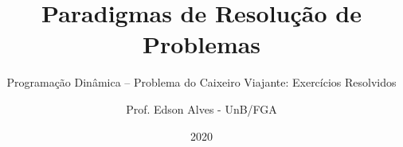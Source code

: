 \title{Paradigmas de Resolução de Problemas}
\subtitle{Programação Dinâmica -- Problema do Caixeiro Viajante: Exercícios Resolvidos}
\author{Prof. Edson Alves - UnB/FGA}
\date{2020}
